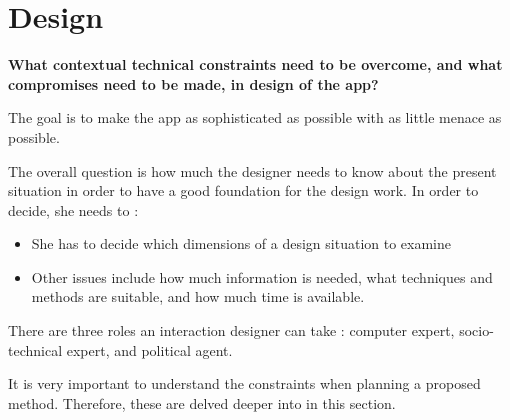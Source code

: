 \section{Design}

\textbf{What contextual technical constraints need to be overcome, and what compromises need to be made, in design of the app?}

The goal is to make the app as sophisticated as possible with as little menace as possible.

The overall question is how much the designer needs to know about the present situation in order to have a good foundation for the design work. In order to decide, she needs to \citep{interactiondesign-lowgren}:

\begin{itemize}
    \item She has to decide which dimensions of a design situation to examine
    \item Other issues include how much information is needed, what techniques and methods are suitable, and how much time is available.
\end{itemize}

There are three roles an interaction designer can take \citep{interactiondesign-lowgren}: computer expert, socio-technical expert, and political agent.

It is very important to understand the constraints when planning a proposed method. Therefore, these are delved deeper into in this section.\\





